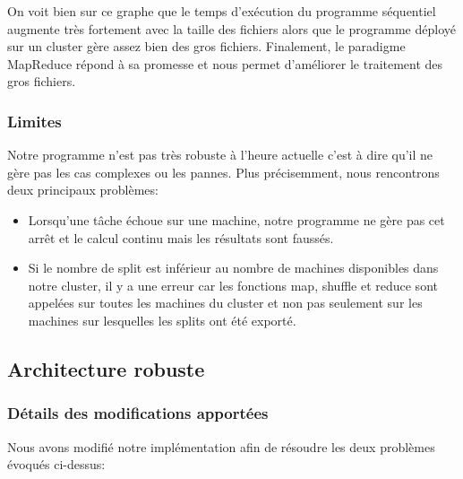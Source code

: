 \documentclass{article}
\begin{document}
On voit bien sur ce graphe que le temps d'exécution du programme séquentiel augmente très fortement avec la taille des fichiers alors que le programme déployé
sur un cluster gère assez bien des gros fichiers. Finalement, le paradigme MapReduce répond à sa promesse et nous permet d'améliorer le traitement des gros fichiers.

\subsubsection{Limites}

Notre programme n'est pas très robuste à l'heure actuelle c'est à dire qu'il ne gère pas les cas complexes ou les pannes. Plus précisemment, 
nous rencontrons deux principaux problèmes:
\begin{itemize}
    \item Lorsqu'une tâche échoue sur une machine, notre programme ne gère pas cet arrêt et le calcul continu mais les résultats sont faussés.
    \item Si le nombre de split est inférieur au nombre de machines disponibles dans notre cluster, il y a une erreur car les fonctions map, shuffle et reduce
    sont appelées sur toutes les machines du cluster et non pas seulement sur les machines sur lesquelles les splits ont été exporté.
\end{itemize}

\subsection{Architecture robuste}
\subsubsection{Détails des modifications apportées}
Nous avons modifié notre implémentation afin de résoudre les deux problèmes évoqués ci-dessus:
\end{document}
